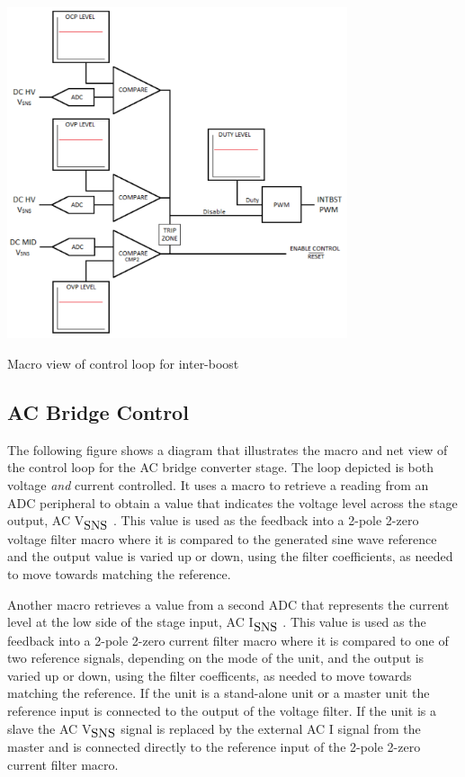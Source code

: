 \begin{DoxyImage}
\includegraphics[width=10cm]{boost_xfmr_loop_R2}
\caption{Macro view of control loop for inter-\/boost}
\end{DoxyImage}
\hypertarget{index_acbctrl}{}\subsection{A\-C Bridge Control}\label{index_acbctrl}
The following figure shows a diagram that illustrates the macro and net view of the control loop for the A\-C bridge converter stage. The loop depicted is both voltage {\itshape and} current controlled. It uses a macro to retrieve a reading from an A\-D\-C peripheral to obtain a value that indicates the voltage level across the stage output, A\-C V$_{\mbox{S\-N\-S}}$ . This value is used as the feedback into a 2-\/pole 2-\/zero voltage filter macro where it is compared to the generated sine wave reference and the output value is varied up or down, using the filter coefficients, as needed to move towards matching the reference.

Another macro retrieves a value from a second A\-D\-C that represents the current level at the low side of the stage input, A\-C I$_{\mbox{S\-N\-S}}$ . This value is used as the feedback into a 2-\/pole 2-\/zero current filter macro where it is compared to one of two reference signals, depending on the mode of the unit, and the output is varied up or down, using the filter coefficents, as needed to move towards matching the reference. If the unit is a stand-\/alone unit or a master unit the reference input is connected to the output of the voltage filter. If the unit is a slave the A\-C V$_{\mbox{S\-N\-S}}$  signal is replaced by the external A\-C I signal from the master and is connected directly to the reference input of the 2-\/pole 2-\/zero current filter macro.

